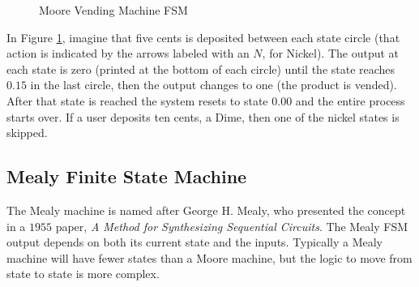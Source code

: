 \begin{figure}[H]
  \caption{Moore Vending Machine FSM}
  \label{SIM:fig:moore_vending_machine_fsm}
  \myfloatalign
\end{figure}

In Figure \ref{SIM:fig:moore_vending_machine_fsm}, imagine that five cents is deposited between each state circle (that action is indicated by the arrows labeled with an $ N $, for Nickel). The output at each state is zero (printed at the bottom of each circle) until the state reaches $ 0.15 $ in the last circle, then the output changes to one (the product is vended). After that state is reached the system resets to state $ 0.00 $ and the entire process starts over. If a user deposits ten cents, a Dime, then one of the nickel states is skipped.

\subsection{Mealy Finite State Machine}
\label{SIM:subsec:mealy_finite_state_machines}

The Mealy machine is named after George H. Mealy, who presented the concept in a $ 1955 $ paper, \emph{A Method for Synthesizing Sequential Circuits}. The Mealy \ac{FSM} output depends on both its current state and the inputs. Typically a Mealy machine will have fewer states than a Moore machine, but the logic to move from state to state is more complex. 

